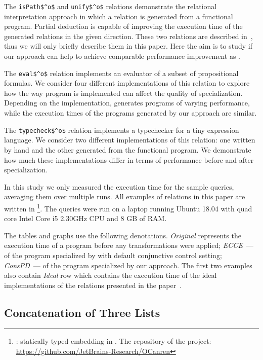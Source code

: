 The \lstinline{isPath$^o$} and \lstinline{unify$^o$} relations demonstrate the relational interpretation approach in which a relation is generated from a functional program.
Partial deduction is capable of improving the execution time of the generated relations in the given direction.
These two relations are described in~\cite{lozov2019relational}, thus we will only briefly describe them in this paper.
Here the aim is to study if our approach can help to achieve comparable performance improvement as \ecce.

The \lstinline{eval$^o$} relation implements an evaluator of a subset of propositional formulas.
We consider four different implementations of this relation to explore how the way program is implemented can affect the quality of specialization.
Depending on the implementation, \ecce generates programs of varying performance, while the execution times of the programs generated by our approach are similar.

The \lstinline{typecheck$^o$} relation implements a typechecker for a tiny expression language.
We consider two different implementations of this relation: one written by hand and the other generated from the functional program.
We demonstrate how much these implementations differ in terms of performance before and after specialization.

In this study we only measured the execution time for the sample queries, averaging them over multiple runs.
All examples of \mk relations in this paper are written in \oc\footnote{\oc: statically typed \mk embedding in \ocaml. The repository of the project: \url{https://github.com/JetBrains-Research/OCanren}}.
The queries were run on a laptop running Ubuntu 18.04 with quad core Intel Core i5 2.30GHz CPU and 8 GB of RAM.

The tables and graphs use the following denotations.
\emph{Original} represents the execution time of a program before any transformations were applied; \emph{ECCE}~--- of the program specialized by \ecce with default conjunctive control setting; \emph{ConsPD}~--- of the program specialized by our approach.
The first two examples also contain \emph{Ideal} row which contains the execution time of the ideal implementations of the relations presented in the paper~\cite{de1999conjunctive}.

\subsection{Concatenation of Three Lists}

